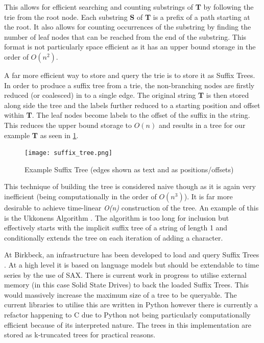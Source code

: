 \documentclass[11pt]{scrartcl}
\begin{document}
	This allows for efficient searching and counting substrings of \textbf{T} by following the trie from the root node.  Each substring \textbf{S} of \textbf{T} is a prefix of a path starting at the root.  It also allows for counting occurrences of the substring by finding the number of leaf nodes that can be reached from the end of the substring.  This format is not particularly space efficient as it has an upper bound storage in the order of \textit{$O(n^{2})$}.
	
	A far more efficient way to store and query the trie is to store it as Suffix Trees.  In order to produce a suffix tree from a trie, the non-branching nodes are firstly reduced (or coalesced) in to a single edge.  The original string \textbf{T} is then stored along side the tree and the labels further reduced to a starting position and offset within \textbf{T}.  The leaf nodes become labels to the offset of the suffix in the string.  This reduces the upper bound storage to \textit{$O(n)$} and results in a tree for our example \textbf{T} as seen in \cref{fig:tree}.
	\begin{figure}[h]
		\label{fig:tree}
		\centering
		\texttt{[image: suffix\_tree.png]}
		\caption{Example Suffix Tree (edges shown as text and as positions/offsets)}
	\end{figure}
	
	This technique of building the tree is considered naive though as it is again very inefficient (being computationally in the order of \textit{$O(n^{3})$}).  It is far more desirable to achieve time-linear \textit{O(n)} construction of the tree.  An example of this is the Ukkonens Algorithm \citep{ukkonens}.  The algorithm is too long for inclusion but effectively starts with the implicit suffix tree of a string of length 1 and conditionally extends the tree on each iteration of adding a character.
	
	At Birkbeck, an infrastructure has been developed to load and query Suffix Trees \citep{bbk-suffix}.  At a high level it is based on language models but should be extendable to time series by the use of SAX.  There is current work in progress to utilise external memory (in this case Solid State Drives) to back the loaded Suffix Trees.  This would massively increase the maximum size of a tree to be queryable.  The current libraries to utilise this are written in Python however there is currently a refactor happening to C due to Python not being particularly computationally efficient because of its interpreted nature.  The trees in this implementation are stored as k-truncated trees for practical reasons.
\end{document}
